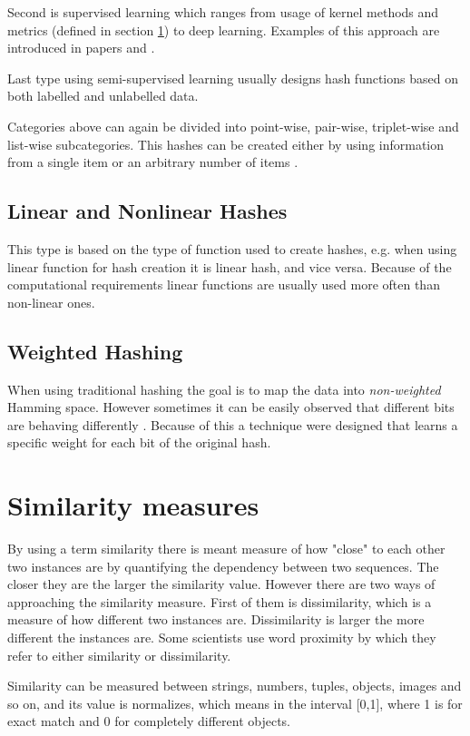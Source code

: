 Second is supervised learning which ranges from usage of kernel methods and metrics (defined in section \ref{similMeasures}) to deep learning. Examples of this approach are introduced in papers \cite{LM1} and 
\cite{LM2}.

Last type using semi-supervised learning usually designs hash functions based on both labelled and unlabelled data.

Categories above can again be divided into point-wise, pair-wise, triplet-wise and list-wise subcategories. This hashes can be created either by using information from a single item or an arbitrary number of items \cite{learnHash}.

\subsection{Linear and Nonlinear Hashes}
This type is based on the type of function used to create hashes, e.g. when using linear function for hash creation it is linear hash, and vice versa. Because of the computational requirements linear functions are usually used more often than non-linear ones. \cite{learnHash}

\subsection{Weighted Hashing}
When using traditional hashing the goal is to map the data into \textit{non-weighted} Hamming space. However sometimes it can be easily observed that different bits are behaving differently \cite{learnHash}. Because of this a technique were designed that learns a specific weight for each bit of the original hash.

\section{Similarity measures}\label{similMeasures}
By using a term similarity there is meant measure of how "close" to each other two instances are by quantifying the dependency between two sequences. The closer they are the larger the similarity value. However there are two ways of approaching the similarity measure. First of them is dissimilarity, which is a measure of how different two instances are. Dissimilarity is larger the more different the instances are. Some scientists use word proximity by which they refer to either similarity or dissimilarity.

Similarity can be measured between strings, numbers, tuples, objects, images and so on, and its value is normalizes, which means in the interval [0,1], where 1 is for exact match and 0 for completely different objects. \cite{simDissim}

